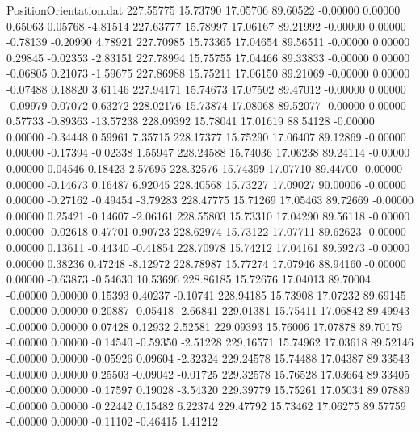 \begin{filecontents}{PositionOrientation.dat}
 227.55775   15.73790   17.05706    89.60522   -0.00000    0.00000    0.65063    0.05768   -4.81514
 227.63777   15.78997   17.06167    89.21992   -0.00000    0.00000   -0.78139   -0.20990    4.78921
 227.70985   15.73365   17.04654    89.56511   -0.00000    0.00000    0.29845   -0.02353   -2.83151
 227.78994   15.75755   17.04466    89.33833   -0.00000    0.00000   -0.06805    0.21073   -1.59675
 227.86988   15.75211   17.06150    89.21069   -0.00000    0.00000   -0.07488    0.18820    3.61146
 227.94171   15.74673   17.07502    89.47012   -0.00000    0.00000   -0.09979    0.07072    0.63272
 228.02176   15.73874   17.08068    89.52077   -0.00000    0.00000    0.57733   -0.89363  -13.57238
 228.09392   15.78041   17.01619    88.54128   -0.00000    0.00000   -0.34448    0.59961    7.35715
 228.17377   15.75290   17.06407    89.12869   -0.00000    0.00000   -0.17394   -0.02338    1.55947
 228.24588   15.74036   17.06238    89.24114   -0.00000    0.00000    0.04546    0.18423    2.57695
 228.32576   15.74399   17.07710    89.44700   -0.00000    0.00000   -0.14673    0.16487    6.92045
 228.40568   15.73227   17.09027    90.00006   -0.00000    0.00000   -0.27162   -0.49454   -3.79283
 228.47775   15.71269   17.05463    89.72669   -0.00000    0.00000    0.25421   -0.14607   -2.06161
 228.55803   15.73310   17.04290    89.56118   -0.00000    0.00000   -0.02618    0.47701    0.90723
 228.62974   15.73122   17.07711    89.62623   -0.00000    0.00000    0.13611   -0.44340   -0.41854
 228.70978   15.74212   17.04161    89.59273   -0.00000    0.00000    0.38236    0.47248   -8.12972
 228.78987   15.77274   17.07946    88.94160   -0.00000    0.00000   -0.63873   -0.54630   10.53696
 228.86185   15.72676   17.04013    89.70004   -0.00000    0.00000    0.15393    0.40237   -0.10741
 228.94185   15.73908   17.07232    89.69145   -0.00000    0.00000    0.20887   -0.05418   -2.66841
 229.01381   15.75411   17.06842    89.49943   -0.00000    0.00000    0.07428    0.12932    2.52581
 229.09393   15.76006   17.07878    89.70179   -0.00000    0.00000   -0.14540   -0.59350   -2.51228
 229.16571   15.74962   17.03618    89.52146   -0.00000    0.00000   -0.05926    0.09604   -2.32324
 229.24578   15.74488   17.04387    89.33543   -0.00000    0.00000    0.25503   -0.09042   -0.01725
 229.32578   15.76528   17.03664    89.33405   -0.00000    0.00000   -0.17597    0.19028   -3.54320
 229.39779   15.75261   17.05034    89.07889   -0.00000    0.00000   -0.22442    0.15482    6.22374
 229.47792   15.73462   17.06275    89.57759   -0.00000    0.00000   -0.11102   -0.46415    1.41212

\end{filecontents}
